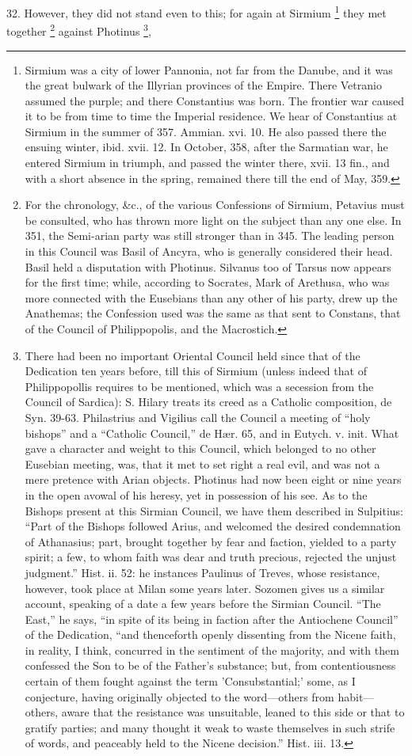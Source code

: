 32. However, they did not
stand even to this; for again at Sirmium \footnote{Sirmium was a city of lower Pannonia, not far from the Danube, and it
was the great bulwark of the Illyrian provinces of the Empire. There
Vetranio assumed the purple; and there Constantius was born. The
frontier war caused it to be from time to time the Imperial residence.
We hear of Constantius at Sirmium in the summer of 357. Ammian. xvi.
10. He also passed there the ensuing winter, ibid. xvii. 12. In
October, 358, after the Sarmatian war, he entered Sirmium in triumph,
and passed the winter there, xvii. 13 fin., and with a short absence
in the spring, remained there till the end of May, 359.} they met together \footnote{For the chronology, \&c., of the various Confessions of Sirmium,
Petavius must be consulted, who has thrown more light on the subject
than any one else. In 351, the Semi-arian party was still stronger
than in 345. The leading person in this Council was Basil of Ancyra,
who is generally considered their head. Basil held a disputation with
Photinus. Silvanus too of Tarsus now appears for the first time;
while, according to Socrates, Mark of Arethusa, who was more connected
with the Eusebians than any other of his party, drew up the Anathemas;
the Confession used was the same as that sent to Constans, that of the
Council of Philippopolis, and the Macrostich.} against Photinus \footnote{There had been no important Oriental Council held since that of the
Dedication ten years before, till this of Sirmium (unless indeed that
of Philippopollis requires to be mentioned, which was a secession from
the Council of Sardica): S. Hilary treats its creed as a Catholic
composition, de Syn. 39-63. Philastrius and Vigilius call the Council
a meeting of ``holy bishops'' and a ``Catholic Council,'' de Hær. 65, and
in Eutych. v. init. What gave a character and weight to this Council,
which belonged to no other Eusebian meeting, was, that it met to set
right a real evil, and was not a mere pretence with Arian objects.
Photinus had now been eight or nine years in the open avowal of his
heresy, yet in possession of his see. As to the Bishops present at
this Sirmian Council, we have them described in Sulpitius: ``Part of
the Bishops followed Arius, and welcomed the desired condemnation of
Athanasius; part, brought together by fear and faction, yielded to a
party spirit; a few, to whom faith was dear and truth precious,
rejected the unjust judgment.'' Hist. ii. 52: he instances Paulinus of
Treves, whose resistance, however, took place at Milan some years
later. Sozomen gives us a similar account, speaking of a date a few
years before the Sirmian Council. ``The East,'' he says, ``in spite of
its being in faction after the Antiochene Council'' of the Dedication, ``and
thenceforth openly dissenting from the Nicene faith, in reality, I
think, concurred in the sentiment of the majority, and with them
confessed the Son to be of the Father's substance; but, from
contentiousness certain of them fought against the term
'Consubstantial;' some, as I conjecture, having originally objected to
the word—others from habit—others, aware that the resistance was
unsuitable, leaned to this side or that to gratify parties; and many
thought it weak to waste themselves in such strife of words, and
peaceably held to the Nicene decision.'' Hist. iii. 13.},
